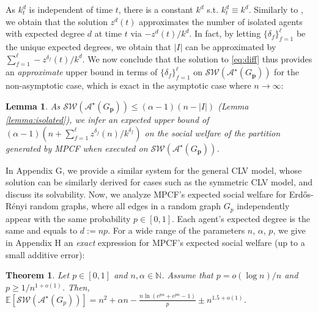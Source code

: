 \documentclass[letterpaper]{article}
\newtheorem{theorem}{Theorem}
\newtheorem{lemma}{Lemma}
\begin{document}
As $k_t^d$ is independent of time $t$, there is a constant $k^d$ s.t. $k_t^d \equiv k^d$. Similarly to \cite[Theorem 6.1]{aamand2022optimal}, we obtain that the solution $z^d(t)$ approximates the number of isolated agents with expected degree $d$ at time $t$ via $-z^d(t)/k^d$. In fact, by letting $\{\delta_f\}_{f=1}^\ell$ be the unique expected degrees, we obtain that $|I|$ can be approximated by $\sum_{f=1}^\ell -z^{\delta_f}(t)/k^d$. We now conclude that the solution to \eqref{eq:diff} thus provides an \textit{approximate} upper bound in terms of $\{\delta_f\}_{f=1}^\ell$ on $\mathcal{SW}(\mathcal{A}^\star(G_\mathbf{p}))$ for the non-asymptotic case, which is exact in the asymptotic case where $n \rightarrow \infty$: %
\begin{lemma}
\label{lemma:expected upper bound}
As $\mathcal{SW}(\mathcal{A}^\star(G_\mathbf{p})) \leq  (\alpha-1) (n-|I|)$ (Lemma \ref{lemma:isolated}), we infer an expected upper bound of $(\alpha-1) (n+\sum_{f=1}^\ell z^{\delta_f}(n)/k^{\delta_f})$ on the social welfare of the partition generated by MPCF when executed on $\mathcal{SW}(\mathcal{A}^\star(G_\mathbf{p}))$.
\end{lemma}

In Appendix G, we provide a similar system for the general CLV model, whose solution can be similarly derived for cases such as the symmetric CLV model, and discuss its solvability. Now, we analyze MPCF's expected social welfare for Erd\H{o}s-R\'{e}nyi random graphs, where all edges in a random graph $G_p$ independently appear with the same probability $p \in [0,1]$. Each agent's expected degree is the same and equals to $d := np$. For a wide range of the parameters $n$, $\alpha$, $p$, we give in Appendix H an \textit{exact} expression for MPCF's expected social welfare (up to a small additive error):
\begin{theorem}
\label{thm:expected sw for erdos}
Let ${p} \in [0,1]$ and $n, \alpha \in \mathbb{N}$. Assume that $p = o(\log n)/n$ and $p \geq 1/ n^{1+o(1)}$. Then, %
$\mathbb{E}[\mathcal{SW}(\mathcal{A}^\star(G_{{p}}))] = n^2 + \alpha n - \frac{n \ln (e^{p\alpha} + e^{pn} - 1 ) }{p} \pm n^{1.5 + o(1)}$.
\end{theorem}
\end{document}

